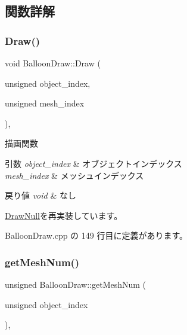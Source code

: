 \subsection{関数詳解}
\mbox{\label{class_balloon_draw_aff3ee0684a7c027878915e332ca895ee}} 
\subsubsection{\texorpdfstring{Draw()}{Draw()}}
{\footnotesize\ttfamily void Balloon\+Draw\+::\+Draw (\begin{DoxyParamCaption}\item[{unsigned}]{object\+\_\+index,  }\item[{unsigned}]{mesh\+\_\+index }\end{DoxyParamCaption})\hspace{0.3cm}{\ttfamily [override]}, {\ttfamily [virtual]}}



描画関数 


\begin{DoxyParams}{引数}
{\em object\+\_\+index} & オブジェクトインデックス \\
\hline
{\em mesh\+\_\+index} & メッシュインデックス \\
\hline
\end{DoxyParams}

\begin{DoxyRetVals}{戻り値}
{\em void} & なし \\
\hline
\end{DoxyRetVals}


\mbox{\hyperlink{class_draw_null_a72ac0b7dc40b1469582419dcc5b0e114}{Draw\+Null}}を再実装しています。



 Balloon\+Draw.\+cpp の 149 行目に定義があります。

\mbox{\label{class_balloon_draw_ab6d1aa381df255809889d9f646154dc5}} 
\subsubsection{\texorpdfstring{get\+Mesh\+Num()}{getMeshNum()}}
{\footnotesize\ttfamily unsigned Balloon\+Draw\+::get\+Mesh\+Num (\begin{DoxyParamCaption}\item[{unsigned}]{object\+\_\+index }\end{DoxyParamCaption})\hspace{0.3cm}{\ttfamily [override]}, {\ttfamily [virtual]}}



